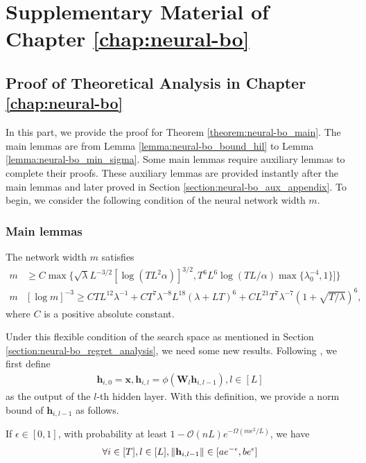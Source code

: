 \chapter{Supplementary Material of Chapter \ref{chap:neural-bo}} 
\label{section:neural-bo_supp}

\section{Proof of Theoretical Analysis in Chapter \ref{chap:neural-bo}}
\label{section:neural-bo_appendix}
In this part, we provide the proof for Theorem \ref{theorem:neural-bo_main}. The main lemmas are from Lemma \ref{lemma:neural-bo_bound_hil} to Lemma \ref{lemma:neural-bo_min_sigma}. Some main lemmas require auxiliary lemmas to complete their proofs. These auxiliary lemmas are provided instantly after the main lemmas and later proved in Section \ref{section:neural-bo_aux_appendix}. To begin, we consider the following condition of the neural network width $m$.
\subsection{Main lemmas}
\begin{condition}
\label{cond:set}
The network width $m$ satisfies
  \begin{align*}
     m & \geq C \max \Big\{ \sqrt{\lambda} L^{-3/2} [\log (TL^2 \alpha)]^{3/2}, T^6 L^6 \log (TL/ \alpha) \max \{\lambda_0^{-4},1 \} ] \Big\} 
     \\
     m  & [\log m ]^{-3} \geq CTL^{12} \lambda^{-1} + CT^7 \lambda^{-8}L^{18}(\lambda + LT)^6 + CL^{21}T^7\lambda^{-7}(1 + \sqrt{T/ \lambda})^6,
    \end{align*} 
    where $C$ is a positive absolute constant.
\end{condition}
Under this flexible condition of the search space as mentioned in Section \ref{section:neural-bo_regret_analysis}, we need some new results. Following \citet{allen2019convergence}, we first define 
\begin{align*}
    \mathbf{h}_{i,0} = \mathbf{x}, \mathbf{h}_{i,l} = \phi(\mathbf{W}_l \mathbf{h}_{i, l-1}), l \in [L]
\end{align*}
as the output of the $l$-th hidden layer. With this definition, we provide a norm bound of $\mathbf{h}_{i, l-1}$ as follows.

\begin{lemma}
\label{lemma:neural-bo_bound_hil}
If $\epsilon \in [0,1]$,  with probability at least $1-\mathcal{O}(nL)e^{-\Omega(m\epsilon^2/L)}$, we have
\[ \forall i \in [T], l \in [L], \norm{\mathbf{h}_{i, l-1}} \in [ae^{-\epsilon}, be^\epsilon] 
\]
\end{lemma}


